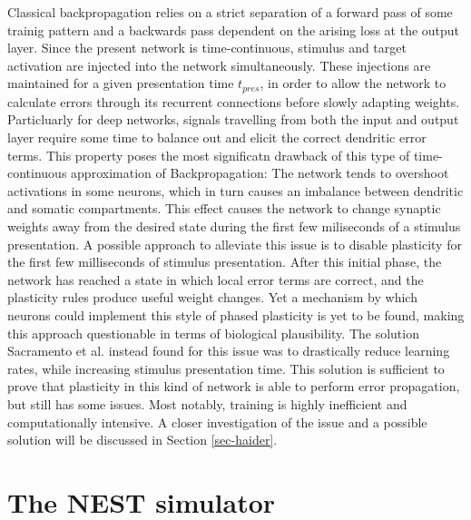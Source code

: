 Classical backpropagation relies on a strict separation of a forward pass of some trainig pattern and a backwards pass
dependent on the arising loss at the output layer. Since the present network is time-continuous, stimulus and target
activation are injected into the network simultaneously. These injections are maintained for a given presentation time
$t_{pres}$, in order to allow the network to calculate errors through its recurrent connections before slowly adapting
weights. Particluarly for deep networks, signals travelling from both the input and output layer require some time to
balance out and elicit the correct dendritic error terms. This property poses the most significatn drawback of this type
of time-continuous approximation of Backpropagation: The network tends to overshoot activations in some neurons, which
in turn causes an imbalance between dendritic and somatic compartments. This effect causes the network to change
synaptic weights away from the desired state during the first few miliseconds of a stimulus presentation. A possible
approach to alleviate this issue is to disable plasticity for the first few milliseconds of stimulus presentation. After
this initial phase, the network has reached a state in which local error terms are correct, and the plasticity rules
produce useful weight changes. Yet a mechanism by which neurons could implement this style of phased plasticity is yet
to be found, making this approach questionable in terms of biological plausibility. The solution Sacramento et al.
instead found for this issue was to drastically reduce learning rates, while increasing stimulus presentation time. This
solution is sufficient to prove that plasticity in this kind of network is able to perform error propagation, but still
has some issues. Most notably, training is highly inefficient and computationally intensive. A closer investigation of
the issue and a possible solution will be discussed in Section \ref{sec-haider}.



\section{The NEST simulator}

